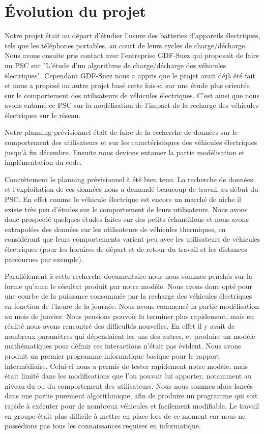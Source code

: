 \section{Évolution du projet}

	Notre projet était au départ d'étudier l'usure des batteries d'appareils électriques, tels que les téléphones portables, au court de leurs cycles de charge/décharge. Nous avons ensuite pris contact avec l'entreprise GDF-Suez qui proposait de faire un PSC sur "L'étude d'un algorithme de charge/décharge des véhicules électriques". Cependant GDF-Suez nous a appris que le projet avait déjà été fait et nous a proposé un autre projet basé cette fois-ci sur une étude plus orientée sur le comportement des utilisateurs de véhicules électriques. C'est ainsi que nous avons entamé ce PSC sur la modélisation de l'impact de la recharge des véhicules électriques sur le réseau. 
	
	Notre planning prévisionnel était de faire de la recherche de données sur le comportement des utilisateurs et sur les caractéristiques des véhicules électriques jusqu'à fin décembre. Ensuite nous devions entamer la partie modélisation et implémentation du code.
	
	Concrètement le planning prévisionnel à été bien tenu. La recherche de données et l'exploitation de ces données nous a demandé beaucoup de travail au début du PSC. En effet comme le véhicule électrique est encore un marché de niche il existe très peu d'études sur le comportement de leurs utilisateurs. Nous avons donc prospecté quelques études faites sur des petits échantillons et nous avons extrapolées des données sur les utilisateurs de véhicules thermiques, en considérant que leurs comportements varient peu avec les utilisateurs de véhicules électriques (pour les horaires de départ et de retour du travail et les distances parcourues par exemple).
	
	Parallèlement à cette recherche documentaire nous nous sommes penchés sur la forme qu'aura le résultat produit par notre modèle. Nous avons donc opté pour une courbe de la puissance consommée par la recharge des véhicules électriques en fonction de l'heure de la journée. 
	Nous avons commencé la partie modélisation au mois de janvier. Nous pensions pouvoir la terminer plus rapidement, mais en réalité nous avons rencontré des difficultés nouvelles. En effet il y avait de nombreux paramètres qui dépendaient les uns des autres, et produire un modèle mathématiques pour définir ces interactions n'était pas évident.
	Nous avons produit un premier programme informatique basique pour le rapport intermédiaire. Celui-ci nous a permis de tester rapidement notre modèle, mais était limité dans les modifications que l'on pouvait lui apporter, notamment au niveau du \smartgrid{} ou du comportement des utilisateurs.
	Nous nous sommes alors lancés dans une partie purement algorithmique, afin de produire un programme qui soit rapide à exécuter pour de nombreux véhicules et facilement modifiable. Le travail en groupe était plus difficile à mettre en place lors de ce moment car nous ne possédions pas tous les connaissances requises en informatique.
	
